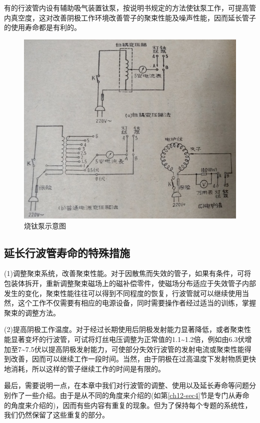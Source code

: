 有的行波管内设有辅助吸气装置钛泵，按说明书规定的方法使钛泵工作，可提高管内真空度，这对改善阴极工作环境改善管子的聚束性能及噪声性能，因而延长管子的使用寿命都是有利的。
\begin{figure}[phtb]
	\centering
	\includegraphics[width=0.52\linewidth]{figure/ch12-1}
	\caption{烧钛泵示意图}
	\label{ch12-1}
\end{figure}
\subsection{延长行波管寿命的特殊措施}
(1)调整聚束系统，改善聚束性能。对于因散焦而失效的管子，如果有条件，可将包装体拆开，重新调整聚束磁场上的磁补偿零件，使磁场分布适应于失效管子内部发生的变化，聚束性能往往可以得到不同程度的恢复，行波管就可以继续使用当然，这个工作不仅需要有相应的电源设备，同时需要操作者经过适当的训练，掌握聚束的调整方法。

(2)提高阴极工作温度。对于经过长期使用后阴极发射能力显著降低，或者聚束性能显著变坏的行波管，可试将灯丝电压调整为正常值的1.1\textasciitilde1.2倍，例如由6.3伏增加至7\textasciitilde7.5伏以提高阴极发射能力，可使部分失效行波管的发射电流或聚束性能得到改善，因而可以继续工作一段时间。当然，由于阴极在过高温度下发射物质更快地消耗，所以这样的管子继续工作的时间是有限的。

最后，需要说明一点，在本章中我们对行波管的调整、使用以及延长寿命等问题分别作了一些介绍。由于是从不同的角度来介绍的(如第\ref{ch12-sec4}节是专门从寿命的角度来介绍的)，因而有些内容有重复的现象。但为了保持每个专题的系统性，我们仍然保留了这些重复的部分。

